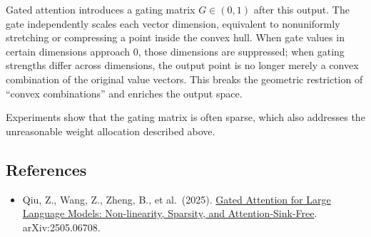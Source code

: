 Gated attention introduces a gating matrix \(G\in(0,1)\) after this output. The gate independently scales each vector dimension, equivalent to nonuniformly stretching or compressing a point inside the convex hull. When gate values in certain dimensions approach 0, those dimensions are suppressed; when gating strengths differ across dimensions, the output point is no longer merely a convex combination of the original value vectors. This breaks the geometric restriction of ``convex combinations'' and enriches the output space.

Experiments show that the gating matrix is often sparse, which also addresses the unreasonable weight allocation described above.

\FloatBarrier
{}
\hypertarget{references-100}{%
\subsection{References}\label{references-100}}

\vspace{0.25em}
\begin{itemize}
\tightlist
\item
  Qiu, Z., Wang, Z., Zheng, B., et al.~(2025). \href{https://arxiv.org/abs/2505.06708}{Gated Attention for Large Language Models: Non-linearity, Sparsity, and Attention-Sink-Free}. arXiv:2505.06708.
\end{itemize}

\clearpage
